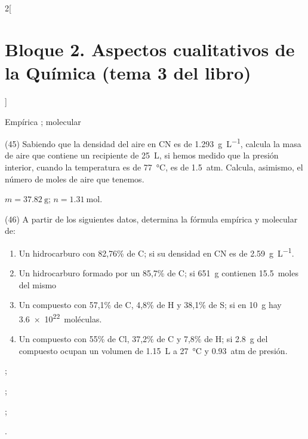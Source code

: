 \documentclass[10pt]{article}
\begin{document}
\begin{multicols}{2}[
    \section{Bloque 2. Aspectos cualitativos de la Química (tema 3 del libro)}
  ]
\begin{solution}
  Empírica ; molecular 
\end{solution}




\begin{exercise}[
    tags    = {},
    topics  = {química,química básica},
    source  = {FQ 1B MGH 2016, p86, e45},
  ]
  (45) Sabiendo que la densidad del aire en CN es de \SI{1.293}{\gram\per\liter}, calcula la masa de aire que contiene un recipiente de \SI{25}{\liter}, si hemos medido que la presión interior, cuando la temperatura es de \SI{77}{\celsius}, es de \SI{1.5}{atm}. Calcula, asimismo, el número de moles de aire que tenemos.
\end{exercise}

\begin{solution}
  \( m = \SI{37.82}{\gram} \); \( n = \SI{1.31}{\mole} \).
\end{solution}




\begin{exercise}[
    tags    = {},
    topics  = {química,química básica},
    source  = {FQ 1B MGH 2016, p86, e46},
  ]
  (46) A partir de los siguientes datos, determina la fórmula empírica y molecular de:

  \begin{enumerate}
    \item Un hidrocarburo con 82,76\% de C; si su densidad en CN es de \SI{2.59}{\gram\per\liter}.
    \item Un hidrocarburo formado por un 85,7\% de C; si \SI{651}{\gram} contienen \SI{15.5}{moles} del mismo
    \item Un compuesto con 57,1\% de C, 4,8\% de H y 38,1\% de S; si en \SI{10}{\gram} hay \SI{3.6e22}{moléculas}.
    \item Un compuesto con 55\% de Cl, 37,2\% de C y 7,8\% de H; si \SI{2.8}{\gram} del compuesto ocupan un volumen de \SI{1.15}{\liter} a \SI{27}{\celsius} y \SI{0.93}{atm} de presión.
  \end{enumerate}
\end{exercise}

\begin{solution}
  \begin{enumerate*}
    \item {};
    \item {};
    \item {};
    \item {}.
  \end{enumerate*}
\end{solution}





\end{multicols}
\end{document}
